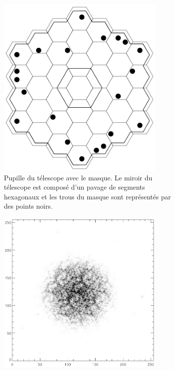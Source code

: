 \begin{figure}[ht!]
    \centering
    \begin{subfigure}[t]{0.31\textwidth}
        \centering
        \includegraphics[width=0.9\textwidth]{Figure_Chap1/Tuthill2000_Figure3a.png}
        \caption{Pupille du télescope avec le masque. Le miroir du télescope est composé d'un pavage de segments hexagonaux et les trous du masque sont représentés par des points noirs.}
        \label{fig:KeckPupilMaskingA}
    \end{subfigure}\hspace{0.01\textwidth}
    \begin{subfigure}[t]{0.31\textwidth}
        \centering
        \includegraphics[width=0.9\textwidth]{Figure_Chap1/Tuthill2000_Figure3b.png}

\end{subfigure}
\end{figure}
